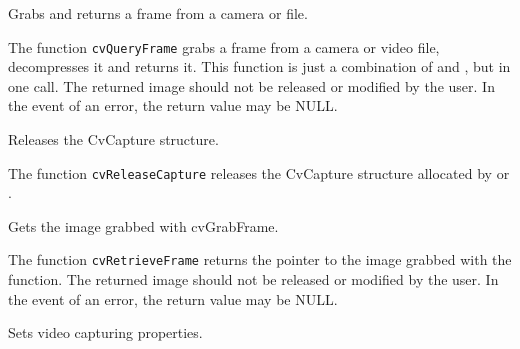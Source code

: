 Grabs and returns a frame from a camera or file.


\begin{description}
\end{description}

The function \texttt{cvQueryFrame} grabs a frame from a camera or video file, decompresses it and returns it. This function is just a combination of  and , but in one call. The returned image should not be released or modified by the user.  In the event of an error, the return value may be NULL.

\ifC
{} 
Releases the CvCapture structure.


\begin{description}
\end{description}

The function \texttt{cvReleaseCapture} releases the CvCapture structure allocated by  or .
\fi

Gets the image grabbed with cvGrabFrame.


\begin{description}
\end{description}

The function \texttt{cvRetrieveFrame} returns the pointer to the image grabbed with the  function. The returned image should not be released or modified by the user.  In the event of an error, the return value may be NULL.


Sets video capturing properties.


